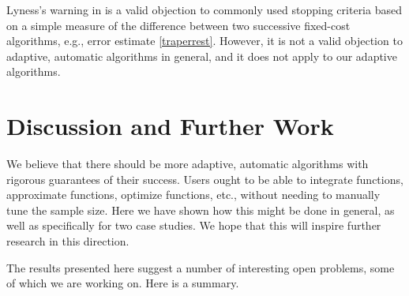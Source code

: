 \documentclass[]{elsarticle}
\theoremstyle{definition}
\theoremstyle{remark}
\begin{document}
Lyness's warning in \cite{Lyn83} is a valid objection to commonly used stopping criteria based on a simple measure of the difference between two successive fixed-cost algorithms, e.g., error estimate \eqref{traperrest}. However, it is not a valid objection to adaptive, automatic algorithms in general, and it does not apply to our adaptive algorithms.

\section{Discussion and Further Work} \label{furthersec}

We believe that there should be more adaptive, automatic algorithms with rigorous guarantees of their success.  Users ought to be able to integrate functions, approximate functions, optimize functions, etc., without needing to manually tune the sample size.  Here we have shown how this might be done in general, as well as specifically for two case studies.  We hope that this will inspire further research in this direction.

The results presented here suggest a number of interesting open problems, some of which we are working on.  Here is a summary.
\end{document}
